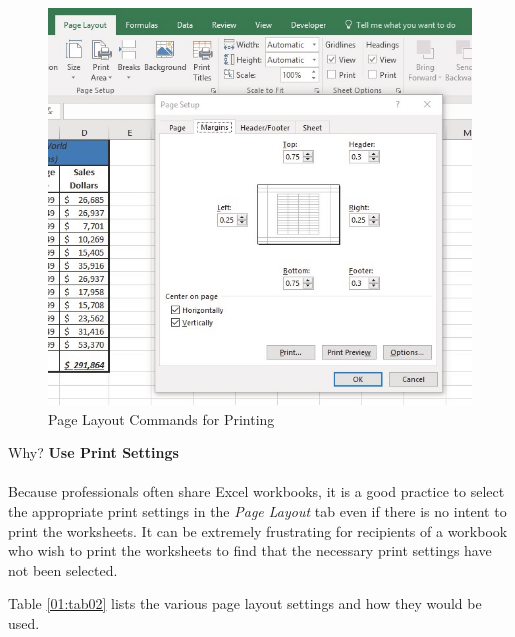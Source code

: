 \begin{figure}[H]
	\centering
	\includegraphics[width=\maxwidth{.95\linewidth}]{gfx/ch01_fig49}
	\caption{Page Layout Commands for Printing}
	\label{01:fig49}
\end{figure}

\begin{center}
	\begin{infobox}{Why?}
		\textbf{Use Print Settings}
		\\
		\\
		Because professionals often share Excel workbooks, it is a good practice to select the appropriate print settings in the \textit{Page Layout} tab even if there is no intent to print the worksheets. It can be extremely frustrating for recipients of a workbook who wish to print the worksheets to find that the necessary print settings have not been selected. 
	\end{infobox}
\end{center}

Table \ref{01:tab02} lists the various page layout settings and how they would be used.


